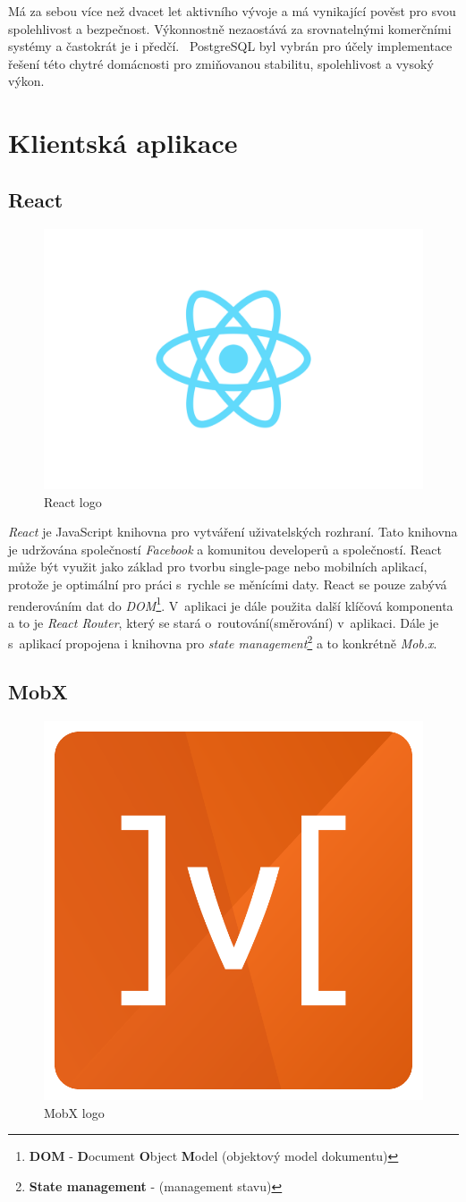 Má za sebou více než dvacet let aktivního vývoje a má vynikající pověst pro svou spolehlivost a bezpečnost.
Výkonnostně nezaostává za srovnatelnými komerčními systémy a častokrát je i předčí.~\cite{postgres:wiki}
PostgreSQL byl vybrán pro účely implementace řešení této chytré domácnosti pro zmiňovanou stabilitu, spolehlivost a vysoký výkon.

\newpage
\section{Klientská aplikace}
\label{pouzite:frontend}

\subsection*{React}
\label{frontend:react}

\begin{figure}[hbt]
  \centering
  \includegraphics[width=.3 \linewidth]{obrazky-figures/react.png}
  \caption{React logo}
\end{figure}

\emph{React} je JavaScript knihovna pro vytváření uživatelských rozhraní.
Tato knihovna je udržována společností \emph{Facebook} a komunitou developerů a společností.
React může být využit jako základ pro tvorbu single-page nebo mobilních aplikací, protože je optimální pro práci s~rychle se měnícími daty.
React se pouze zabývá renderováním dat do \emph{DOM}\footnote{\textbf{DOM} - \textbf{D}ocument \textbf{O}bject \textbf{M}odel (objektový model dokumentu)}.
V~aplikaci je dále použita další klíčová komponenta a to je \emph{React Router}, který se stará o~routování(směrování) v~aplikaci.
Dále je s~aplikací propojena i knihovna pro \emph{state management}\footnote{\textbf{State management} - (management stavu)} a to konkrétně \emph{Mob.x}.~\cite{react:info}

\subsection*{MobX}
\label{frontend:mobx}
\begin{figure}[hbt]
  \centering
  \includegraphics[width=.1 \linewidth]{obrazky-figures/mobx.png}
  \caption{MobX logo}
\end{figure}

